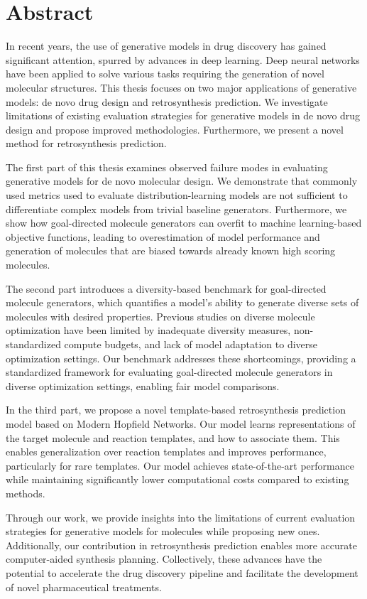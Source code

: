 
{%
\chapter*{Abstract}
In recent years, the use of generative models in drug discovery has gained significant attention,
spurred by advances in deep learning. Deep neural networks have been applied to solve various tasks
requiring the generation of novel molecular structures. This thesis focuses on two major
applications of generative models: de novo drug design and retrosynthesis prediction. We investigate
limitations of existing evaluation strategies for generative models in de novo drug design and
propose improved methodologies. Furthermore, we present a novel method for retrosynthesis
prediction.

The first part of this thesis examines observed failure modes in evaluating generative models for de
novo molecular design. We demonstrate that commonly used metrics used to evaluate
distribution-learning models are not sufficient to differentiate complex models from trivial
baseline generators. Furthermore, we show how goal-directed molecule generators can overfit to
machine learning-based objective functions, leading to overestimation of model performance and
generation of molecules that are biased towards already known high scoring molecules.

The second part introduces a diversity-based benchmark for goal-directed molecule generators, which
quantifies a model's ability to generate diverse sets of molecules with desired properties. Previous
studies on diverse molecule optimization have been limited by inadequate diversity measures,
non-standardized compute budgets, and lack of model adaptation to diverse optimization settings. Our
benchmark addresses these shortcomings, providing a standardized framework for evaluating
goal-directed molecule generators in diverse optimization settings, enabling fair model
comparisons.

In the third part, we propose a novel template-based retrosynthesis prediction model based on Modern
Hopfield Networks. Our model learns representations of the target molecule and reaction templates,
and how to associate them. This enables generalization over reaction templates and improves
performance, particularly for rare templates. Our model achieves state-of-the-art performance while
maintaining significantly lower computational costs compared to existing methods.

Through our work, we provide insights into the limitations of current evaluation strategies for
generative models for molecules while proposing new ones. Additionally, our
contribution in retrosynthesis prediction enables more accurate computer-aided synthesis planning.
Collectively, these advances have the potential to accelerate the drug discovery pipeline and
facilitate the development of novel pharmaceutical treatments.
}%